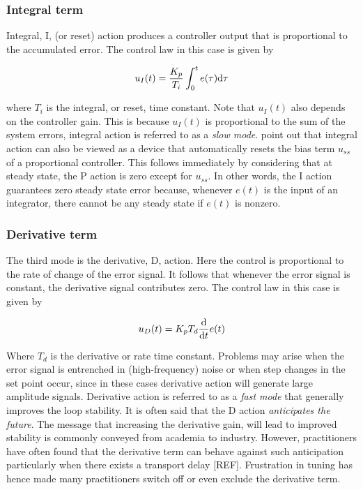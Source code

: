 \subsubsection*{Integral term}

Integral, I, (or reset) action produces a controller output that is proportional to the accumulated error. The control law in this case is given by

\[u_I( t ) = \frac{K_p}{T_i}\int_0^t e(\tau)\mathrm{d} \tau \]

\noindent where $T_i$ is the integral, or reset, time constant. Note that $u_I(t)$ also depends on the controller gain. This is because  $u_I(t)$ is proportional to the sum of the system errors, integral action is referred to as a \emph{slow mode}.\cite{astromhagglund2006} point out that integral action can also be viewed as a device that automatically resets the bias term $u_{ss}$ of a proportional controller. This follows immediately by considering that at steady state,  the P action is zero except for $u_{ss}$. In other words, the I action guarantees zero steady state error because, whenever $e(t)$ is the input of an integrator, there cannot be any steady state if $e(t)$ is nonzero.

\subsubsection*{Derivative term}

The third mode is the derivative, D,  action. Here the control is proportional to the rate of change of the error signal. It follows that whenever the error signal is constant, the derivative signal contributes zero. The control law in this case is given by

\[u_D(t) = K_pT_d \frac{\mathrm{d}}{\mathrm{d} t}e(t)\]

Where $T_d$ is the derivative or rate time constant. Problems may arise when the error signal is entrenched in (high-frequency) noise or when step changes in the set point occur, since in these cases derivative action will generate large amplitude signals. Derivative action is referred to as a \emph{fast mode} that generally improves the loop stability. It is often said that the D action \emph{anticipates the future}. The message that increasing the derivative gain, will lead to improved stability is commonly conveyed from academia to industry. However, practitioners have often found that the derivative term can behave against such anticipation particularly when there exists a transport delay [REF]. Frustration in tuning  has hence made many practitioners switch off or even exclude the derivative term.  


